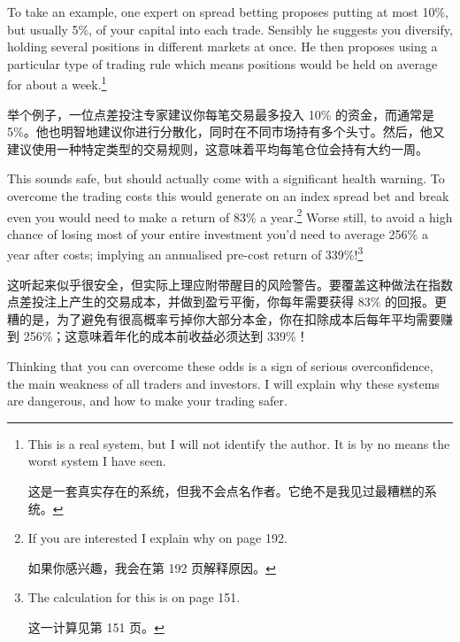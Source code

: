 \bipairgap

\begin{englishblock} To take an example, one expert on spread betting proposes putting at most 10\%, but usually 5\%, of your capital into each trade. Sensibly he suggests you diversify, holding several positions in different markets at once. He then proposes using a particular type of trading rule which means positions would be held on average for about a week.\footnote{This is a real system, but I will not identify the author. It is by no means the worst system I have seen. \par 这是一套真实存在的系统，但我不会点名作者。它绝不是我见过最糟糕的系统。}\end{englishblock}

\begin{chineseblock}举个例子，一位点差投注专家建议你每笔交易最多投入 10\% 的资金，而通常是 5\%。他也明智地建议你进行分散化，同时在不同市场持有多个头寸。然后，他又建议使用一种特定类型的交易规则，这意味着平均每笔仓位会持有大约一周。\end{chineseblock}

\bipairgap

\begin{englishblock} This sounds safe, but should actually come with a significant health warning. To overcome the trading costs this would generate on an index spread bet and break even you would need to make a return of 83\% a year.\footnote{If you are interested I explain why on page 192. \par 如果你感兴趣，我会在第 192 页解释原因。} Worse still, to avoid a high chance of losing most of your entire investment you'd need to average 256\% a year after costs; implying an annualised pre-cost return of 339\%!\footnote{The calculation for this is on page 151. \par 这一计算见第 151 页。}\end{englishblock}

\begin{chineseblock}这听起来似乎很安全，但实际上理应附带醒目的风险警告。要覆盖这种做法在指数点差投注上产生的交易成本，并做到盈亏平衡，你每年需要获得 83\% 的回报。更糟的是，为了避免有很高概率亏掉你大部分本金，你在扣除成本后每年平均需要赚到 256\%；这意味着年化的成本前收益必须达到 339\%！ \end{chineseblock}

\bipairgap

\begin{englishblock} Thinking that you can overcome these odds is a sign of serious overconfidence, the main weakness of all traders and investors. I will explain why these systems are dangerous, and how to make your trading safer. \end{englishblock}

